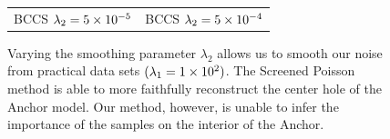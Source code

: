 \begin{figure}
\begin{tabular}{c c}
		BCCS $\lambda_2=5\times 10^{-5}$ & BCCS $\lambda_2 = 5\times 10^{-4}$ \\
	\end{tabular}
	\caption{Varying the smoothing parameter $\lambda_2$ allows us to smooth our noise from practical data sets $(\lambda_1 = 1\times 10^{2})$. The Screened Poisson method is able to more faithfully reconstruct the center hole of the Anchor model. Our method, however, is unable to infer the importance of the samples on the interior of the Anchor.}
	\label{fig:r2}
\end{figure}
